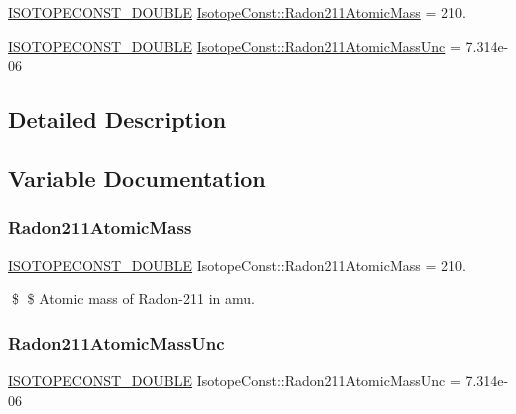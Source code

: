 \begin{DoxyCompactItemize}
\item 
\mbox{\hyperlink{group___isotope_const-_macros_ga8f45a7272ce02c0b4c65c44636ed719a}{I\+S\+O\+T\+O\+P\+E\+C\+O\+N\+S\+T\+\_\+\+D\+O\+U\+B\+LE}} \mbox{\hyperlink{group___isotope_const-_radon-_rn211_ga6b40e67b327134b8c3868f7feb514b5d}{Isotope\+Const\+::\+Radon211\+Atomic\+Mass}} = 210.
\item 
\mbox{\hyperlink{group___isotope_const-_macros_ga8f45a7272ce02c0b4c65c44636ed719a}{I\+S\+O\+T\+O\+P\+E\+C\+O\+N\+S\+T\+\_\+\+D\+O\+U\+B\+LE}} \mbox{\hyperlink{group___isotope_const-_radon-_rn211_gaccccedbf571ac57fcd357fbfff30da64}{Isotope\+Const\+::\+Radon211\+Atomic\+Mass\+Unc}} = 7.\+314e-\/06
\end{DoxyCompactItemize}


\subsection{Detailed Description}


\subsection{Variable Documentation}
\mbox{\label{group___isotope_const-_radon-_rn211_ga6b40e67b327134b8c3868f7feb514b5d}} 
\subsubsection{\texorpdfstring{Radon211\+Atomic\+Mass}{Radon211AtomicMass}}
{\footnotesize\ttfamily \mbox{\hyperlink{group___isotope_const-_macros_ga8f45a7272ce02c0b4c65c44636ed719a}{I\+S\+O\+T\+O\+P\+E\+C\+O\+N\+S\+T\+\_\+\+D\+O\+U\+B\+LE}} Isotope\+Const\+::\+Radon211\+Atomic\+Mass = 210.}

\$ \$ Atomic mass of Radon-\/211 in amu. \mbox{\label{group___isotope_const-_radon-_rn211_gaccccedbf571ac57fcd357fbfff30da64}} 
\subsubsection{\texorpdfstring{Radon211\+Atomic\+Mass\+Unc}{Radon211AtomicMassUnc}}
{\footnotesize\ttfamily \mbox{\hyperlink{group___isotope_const-_macros_ga8f45a7272ce02c0b4c65c44636ed719a}{I\+S\+O\+T\+O\+P\+E\+C\+O\+N\+S\+T\+\_\+\+D\+O\+U\+B\+LE}} Isotope\+Const\+::\+Radon211\+Atomic\+Mass\+Unc = 7.\+314e-\/06}

